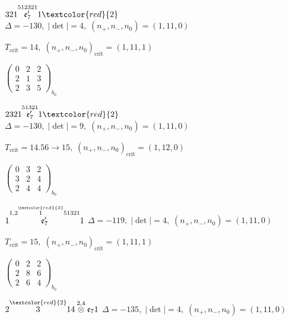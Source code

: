 \documentclass[10pt]{article}
\begin{document}
\smallskip

$321\overset{512321}{\mathfrak{e}_7'}1\textcolor{red}{2}$ \quad $\Delta=-130,\; |\det|=4,\; (n_+,n_-,n_0)=(1,11,0)$

\hspace{1em}$T_{\text{crit}}=14,\; (n_+,n_-,n_0)_{\text{crit}}=(1,11,1)$

\hspace{2em}$\left(\begin{smallmatrix}0 & 2 & 2 \\ 2 & 1 & 3 \\ 2 & 3 & 5\end{smallmatrix}\right)_{\!b_0}$

\smallskip

$2321\overset{51321}{\mathfrak{e}_7'}1\textcolor{red}{2}$ \quad $\Delta=-130,\; |\det|=9,\; (n_+,n_-,n_0)=(1,11,0)$

\hspace{1em}$T_{\text{crit}}=14.56 \to 15,\; (n_+,n_-,n_0)_{\text{crit}}=(1,12,0)$

\hspace{2em}$\left(\begin{smallmatrix}0 & 3 & 2 \\ 3 & 2 & 4 \\ 2 & 4 & 4\end{smallmatrix}\right)_{\!b_0}$

\smallskip

$1\overset{1,2\overset{\textcolor{red}{2}}{1}51321}{\mathfrak{e}_7'}1$ \quad $\Delta=-119,\; |\det|=4,\; (n_+,n_-,n_0)=(1,11,0)$

\hspace{1em}$T_{\text{crit}}=15,\; (n_+,n_-,n_0)_{\text{crit}}=(1,11,1)$

\hspace{2em}$\left(\begin{smallmatrix}0 & 2 & 2 \\ 2 & 8 & 6 \\ 2 & 6 & 4\end{smallmatrix}\right)_{\!b_0}$

\smallskip

$2\overset{\textcolor{red}{2}}{3}14\overset{2,4}{\otimes}\mathfrak{e}_71$ \quad $\Delta=-135,\; |\det|=4,\; (n_+,n_-,n_0)=(1,11,0)$
\end{document}
